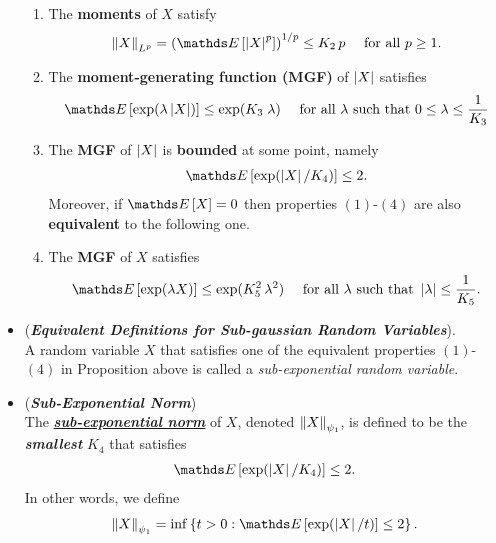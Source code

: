 \documentclass[11pt]{article}
\begin{document}
\begin{itemize}
\begin{proposition}
\begin{enumerate}
\item The \textbf{moments} of $X$ satisfy
\begin{align*}
\norm{X}{L^p} = \paren{\E{}{\abs{X}^p}}^{1/p} \le K_2\, p\quad \text{ for all }p \ge 1.
\end{align*}

\item The \textbf{moment-generating function (MGF)} of $\left\lvert X \right\rvert$ satisfies
\begin{align*}
\E{}{\exp(\lambda \abs{X})} \le \exp(K_3\;\lambda) \quad \text{ for all $\lambda$ such that $0 \le \lambda \le \frac{1}{K_3}$}
\end{align*}

\item The \textbf{MGF} of $\left\lvert X \right\rvert$ is \textbf{bounded} at some point, namely
\begin{align*}
\E{}{\exp(\abs{X} / K_4)} \le 2.
\end{align*}
Moreover, if $\E{}{X} = 0$ then properties $(1)$-$(4)$ are also \textbf{equivalent} to the following one.

\item The \textbf{MGF} of $X$ satisfies
\begin{align*}
\E{}{\exp(\lambda X)} \le  \exp(K_5^2\,\lambda^2)\quad\text{ for all }\lambda \text{ such that } \abs{\lambda} \le \frac{1}{K_5}.
\end{align*}
\end{enumerate}
\end{proposition}

\item \begin{remark} (\textbf{\emph{Equivalent Definitions for Sub-gaussian Random Variables}}). \\
A random variable $X$ that satisfies one of the equivalent properties $(1)$-$(4)$ in Proposition above is called a \emph{sub-exponential random variable}. 
\end{remark}

\item \begin{definition} (\textbf{\emph{Sub-Exponential Norm}}) \\
The \underline{\emph{\textbf{sub-exponential norm}}} of $X$, denoted $\left\|X\right\|_{\psi_1}$, is defined
to be the \emph{\textbf{smallest}} $K_4$ that satisfies 
\begin{align*}
\E{}{\exp(\abs{X} / K_4)} \le 2.
\end{align*} In other words, we define
\begin{align}
\norm{X}{\psi_1}= \inf\set{t > 0: \E{}{\exp(\abs{X} / t)} \le 2}.  \label{eqn: sub_gaussian_norm}
\end{align}
\end{definition}


\end{itemize}
\end{document}
